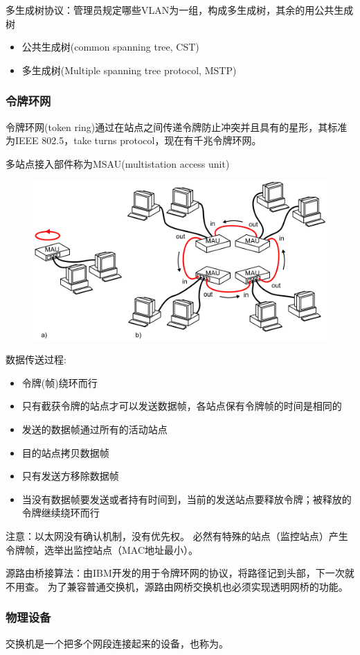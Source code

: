 \myhline
多生成树协议：管理员规定哪些VLAN为一组，构成多生成树，其余的用公共生成树
\begin{itemize}
	\item 公共生成树(common spanning tree, CST)
	\item 多生成树(Multiple spanning tree protocol, MSTP)
\end{itemize}

\subsubsection{令牌环网}
令牌环网(token ring)通过在站点之间传递令牌防止冲突并且具有的星形，其标准为IEEE 802.5，take turns protocol，现在有千兆令牌环网。

多站点接入部件称为MSAU(multistation access unit)
\begin{figure}[H]
	\centering
	\includegraphics[width=0.5\linewidth]{fig/token-ring.png}
\end{figure}

数据传送过程:
\begin{itemize}
	\item 令牌(帧)绕环而行
	\item 只有截获令牌的站点才可以发送数据帧，各站点保有令牌帧的时间是相同的
	\item 发送的数据帧通过所有的活动站点
	\item 目的站点拷贝数据帧
	\item 只有发送方移除数据帧
	\item 当没有数据帧要发送或者持有时间到，当前的发送站点要释放令牌；被释放的令牌继续绕环而行
\end{itemize}

注意：以太网没有确认机制，没有优先权。
必然有特殊的站点（监控站点）产生令牌帧，选举出监控站点（MAC地址最小）。

源路由桥接算法：由IBM开发的用于令牌环网的协议，将路径记到头部，下一次就不用查。
为了兼容普通交换机，源路由网桥交换机也必须实现透明网桥的功能。

\subsubsection{物理设备}
\label{subsub:physical_equipment}
交换机是一个把多个网段连接起来的设备，也称为。

